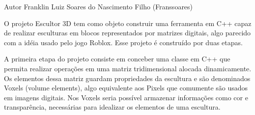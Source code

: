 \begin{DoxyAuthor}{Autor}
Franklin Luiz Soares do Nascimento Filho (Franssoares)
\end{DoxyAuthor}
O projeto Escultor 3D tem como objeto construir uma ferramenta em C++ capaz de realizar esculturas em blocos representados por matrizes digitais, algo parecido com a idéia usado pelo jogo Roblox. Esse projeto é construído por duas etapas.

A primeira etapa do projeto consiste em conceber uma classe em C++ que permita realizar operações em uma matriz tridimensional alocada dinamicamente. Os elementos dessa matriz guardam propriedades da escultura e são denominados Voxels (volume elements), algo equivalente aos Pixels que comumente são usados em imagens digitais. Nos Voxels seria possível armazenar informações como cor e transparência, necessárias para idealizar os elementos de uma escultura. 